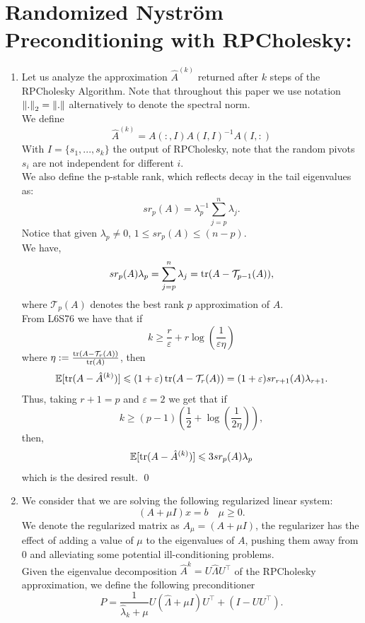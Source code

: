 \documentclass[12pt,letterpaper]{article}
\renewcommand{\le}{\leqslant}
\renewcommand{\ge}{\geqslant}
\newcommand{\eps}{\varepsilon}
\newcommand{\snorm}[1]{\norm{#1}_2}
\newcommand{\Expect}{\operatorname{\mathbb{E}}}
\begin{document}
\section*{
Randomized Nyström Preconditioning with RPCholesky:}
\begin{enumerate}
    \item 
    Let us analyze the approximation $\hat A^{(k)}$ returned after $k$ steps of the RPCholesky Algorithm. Note that throughout this paper we use notation $\snorm{.} = \norm{.}$ alternatively to denote the spectral norm.\\
    We define
    $$
    \hat A^{(k)} = 
    A(:,I)A(I,I)^{-1}A(I,:)
    $$
    With $I= \{ s_1,...,s_k\}$ the output of RPCholesky, note that the random pivots $s_i$ are not independent for different $i$.\\
    We also define the p-stable rank, which reflects decay in the tail eigenvalues as:
    $$
    sr_p(A)=\lambda_p^{-1}\sum_{j=p}^n\lambda _j.
    $$
    Notice that given $\lambda_p \ne 0$, $1 \le sr_p(A) \le (n-p)$.\\
    We have,
    $$
    sr_p(A)\lambda_p = \sum_{j=p}^n\lambda _j
    = \trace(A - \mathcal T_{p-1}(A)),
    $$
    where $\mathcal T_p(A)$ denotes the best rank $p$ approximation of $A$.\\
    From L6S76 we have that if 
    $$
    k \ge \frac{r}{\eps} + r\log (\frac{1}{\eps \eta})
    $$
    where $\eta := \frac{\trace(A- \mathcal{T} _r(A))}{\trace(A)}$, then
    $$
    \Expect [\trace(A-\hat A^{(k)})] \le (1+\eps) \trace(A-\mathcal T_{r}(A)) = (1+\eps) sr_{r+1}(A)\lambda_{r+1}.
    $$
    Thus, taking $r+1 = p$ and $\eps = 2$ we get that if
    $$
    k \ge (p-1)(\frac{1}{2} + \log (\frac{1}{2 \eta})),
    $$
    then,
    $$
    \Expect [\trace(A-\hat A^{(k)})] \le  3 sr_{p}(A)\lambda_{p}
    $$
    which is the desired result. \qed
    \item 
    We consider that we are solving the following regularized linear system:
    $$
    (A+\mu I)x=b \quad \mu \ge 0.
    $$
    We denote the regularized matrix as $A_\mu = (A+\mu I)$, the regularizer has the effect of adding a value of $\mu$ to the eigenvalues of $A$, pushing them away from $0$ and alleviating some potential ill-conditioning problems.\\
    Given the eigenvalue decomposition $\hat A^{k}=U\hat \Lambda U^\top$ of the RPCholesky approximation, we define the following preconditioner
    $$
    P = \frac{1}{\hat \lambda_k + \mu}U(\hat \Lambda + \mu I)U^\top + (I-UU^\top).
    $$

\end{enumerate}
\end{document}
